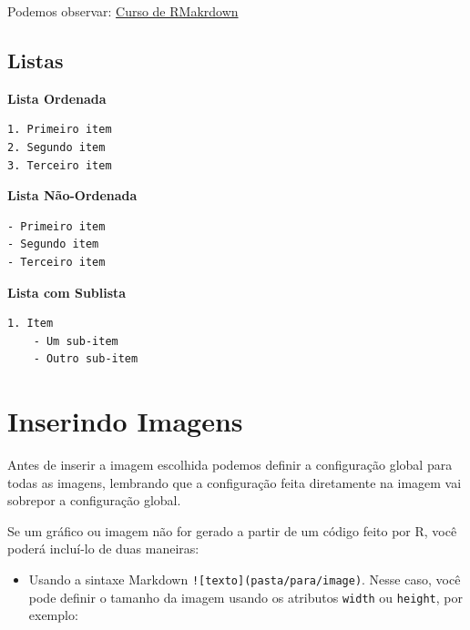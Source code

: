 \documentclass[
]{book}
\newenvironment{Shaded}{\begin{snugshade}}{\end{snugshade}}
\newcommand{\InformationTok}[1]{\textcolor[rgb]{0.56,0.35,0.01}{\textbf{\textit{#1}}}}
\providecommand{\tightlist}{%
  \setlength{\itemsep}{0pt}\setlength{\parskip}{0pt}}
\begin{document}
Podemos observar:
\href{https://estatsej.github.io/curso_rmarkdown}{Curso de RMakrdown}

\hypertarget{listas}{%
\subsection{Listas}\label{listas}}

\textbf{Lista Ordenada}

\begin{verbatim}
1. Primeiro item
2. Segundo item
3. Terceiro item
\end{verbatim}

\textbf{Lista Não-Ordenada}

\begin{verbatim}
- Primeiro item
- Segundo item
- Terceiro item
\end{verbatim}

\textbf{Lista com Sublista}

\begin{verbatim}
1. Item
    - Um sub-item
    - Outro sub-item
\end{verbatim}

\hypertarget{inserindo-imagens}{%
\section{Inserindo Imagens}\label{inserindo-imagens}}

Antes de inserir a imagem escolhida podemos definir a configuração global para todas as imagens, lembrando que a configuração feita diretamente na imagem vai sobrepor a configuração global.

\begin{Shaded}
\end{Shaded}

Se um gráfico ou imagem não for gerado a partir de um código feito por R, você poderá incluí-lo de duas maneiras:

\begin{itemize}
\tightlist
\item
  Usando a sintaxe Markdown \texttt{!{[}texto{]}(pasta/para/image)}. Nesse caso, você pode definir o tamanho da imagem usando os atributos \texttt{width} ou \texttt{height}, por exemplo:
\end{itemize}
\end{document}
